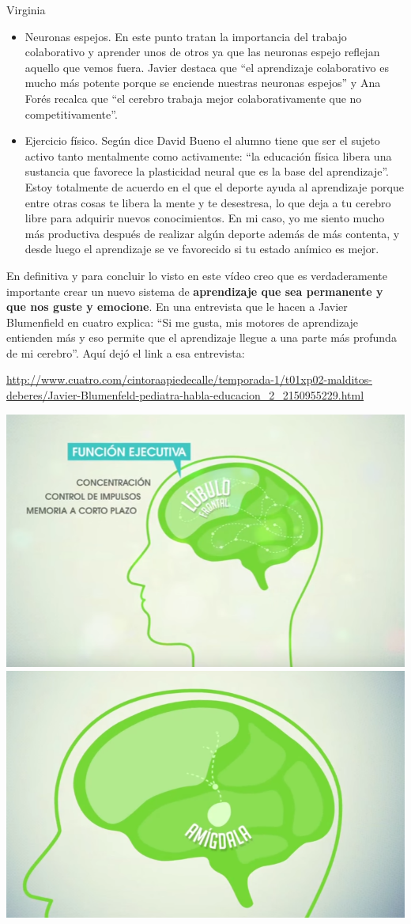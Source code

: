 \begin{opin}{\virgicolor}{Virginia}
\begin{itemize}
\item Neuronas espejos. En este punto tratan la importancia del trabajo colaborativo y aprender unos de otros ya que las neuronas espejo reflejan aquello que vemos fuera. Javier destaca que “el aprendizaje colaborativo es mucho más potente porque se enciende nuestras neuronas espejos” y Ana Forés recalca que “el cerebro trabaja mejor colaborativamente que no competitivamente”. 

 
\item Ejercicio físico. Según dice David Bueno el alumno tiene que ser el sujeto activo tanto mentalmente como activamente: “la educación física libera una sustancia que favorece la plasticidad neural que es la base del aprendizaje”. Estoy totalmente de acuerdo en el que el deporte ayuda al aprendizaje porque entre otras cosas te libera la mente y te desestresa, lo que deja a tu cerebro libre para adquirir nuevos conocimientos. En mi caso, yo me siento mucho más productiva después de realizar algún deporte además de más contenta, y desde luego el aprendizaje se ve favorecido si tu estado anímico es mejor. 

\end{itemize}


En definitiva y para concluir lo visto en este vídeo creo que es verdaderamente importante crear un nuevo sistema de \textbf{aprendizaje que sea permanente y que nos guste y emocione}. En una entrevista que le hacen a Javier Blumenfield en cuatro explica: “Si me gusta, mis motores de aprendizaje entienden más y eso permite que el aprendizaje llegue a una parte más profunda de mi cerebro”. Aquí dejó el link a esa entrevista:

\url{http://www.cuatro.com/cintoraapiedecalle/temporada-1/t01xp02-malditos-deberes/Javier-Blumenfeld-pediatra-habla-educacion_2_2150955229.html}



\begin{minipage}[hbtp]{1.0\linewidth}
\centering
\includegraphics[width=0.35\linewidth]{img/viryi1.png}
\includegraphics[width=0.357\linewidth]{img/viryi2.png}
\label{viramigdala}
\end{minipage}


\end{opin}
